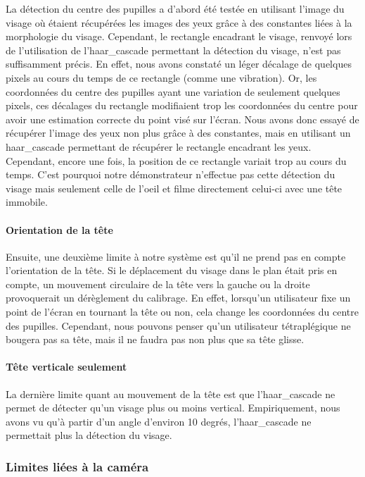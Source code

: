 La détection du centre des pupilles a d’abord été testée en utilisant l’image du visage où étaient récupérées les images des yeux grâce à des constantes liées à la morphologie du visage. Cependant, le rectangle encadrant le visage, renvoyé lors de l’utilisation de l’haar\_cascade permettant la détection du visage, n’est pas suffisamment précis. En effet, nous avons constaté un léger décalage de quelques pixels au cours du temps de ce rectangle (comme une vibration). Or, les coordonnées du centre des pupilles ayant une variation de seulement quelques pixels, ces décalages du rectangle modifiaient trop les coordonnées du centre pour avoir une estimation correcte du point visé sur l’écran. Nous avons donc essayé de récupérer l’image des yeux non plus grâce à des constantes, mais en utilisant un haar\_cascade permettant de récupérer le rectangle encadrant les yeux. Cependant, encore une fois, la position de ce rectangle variait trop au cours du temps. C’est pourquoi notre démonstrateur n’effectue pas cette détection du visage mais seulement celle de l'oeil et filme directement celui-ci avec une tête immobile.

\paragraph{Orientation de la tête}

Ensuite, une deuxième limite à notre système est qu’il ne prend pas en compte l’orientation de la tête. Si le déplacement du visage dans le plan était pris en compte, un mouvement circulaire de la tête vers la gauche ou la droite provoquerait un dérèglement du calibrage. En effet, lorsqu’un utilisateur fixe un point de l’écran en tournant la tête ou non, cela change les coordonnées du centre des pupilles. Cependant, nous pouvons penser qu’un utilisateur tétraplégique ne bougera pas sa tête, mais il ne faudra pas non plus que sa tête glisse.

\paragraph{Tête verticale seulement}
La dernière limite quant  au mouvement de la tête est que l’haar\_cascade ne permet de détecter qu’un visage plus ou moins vertical. Empiriquement, nous avons vu qu’à partir d’un angle d’environ 10 degrés, l’haar\_cascade ne permettait plus la détection du visage. 

\subsubsection{Limites liées à la caméra}

